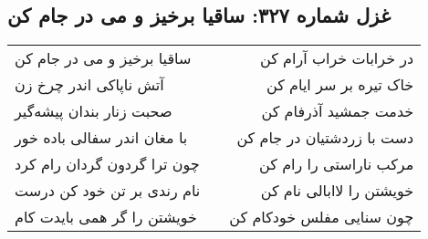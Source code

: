 \begin{center}
\section*{غزل شماره ۳۲۷: ساقیا برخیز و می در جام کن}
\label{sec:327}
\begin{longtable}{l p{0.5cm} r}
ساقیا برخیز و می در جام کن
&&
در خرابات خراب آرام کن
\\
آتش ناپاکی اندر چرخ زن
&&
خاک تیره بر سر ایام کن
\\
صحبت زنار بندان پیشه‌گیر
&&
خدمت جمشید آذرفام کن
\\
با مغان اندر سفالی باده خور
&&
دست با زردشتیان در جام کن
\\
چون ترا گردون گردان رام کرد
&&
مرکب ناراستی را رام کن
\\
نام رندی بر تن خود کن درست
&&
خویشتن را لاابالی نام کن
\\
خویشتن را گر همی بایدت کام
&&
چون سنایی مفلس خودکام کن
\\
\end{longtable}
\end{center}
